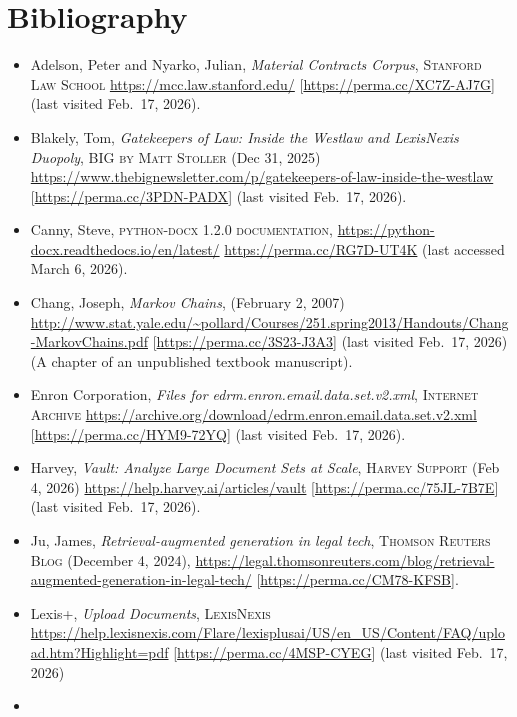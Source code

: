 \documentclass[
]{article}
\providecommand{\tightlist}{%
  \setlength{\itemsep}{0pt}\setlength{\parskip}{0pt}}
\begin{document}
\clearpage

\section{Bibliography}\label{bibliography}

\begin{itemize}
\tightlist
\item
  Adelson, Peter and Nyarko, Julian, \emph{Material Contracts Corpus}, \textsc{Stanford Law School} \url{https://mcc.law.stanford.edu/} {[}\url{https://perma.cc/XC7Z-AJ7G}{]} (last visited Feb.~17, 2026).
\item
  Blakely, Tom, \emph{Gatekeepers of Law: Inside the Westlaw and LexisNexis Duopoly}, \textsc{BIG by Matt Stoller} (Dec 31, 2025) \url{https://www.thebignewsletter.com/p/gatekeepers-of-law-inside-the-westlaw} {[}\url{https://perma.cc/3PDN-PADX}{]} (last visited Feb.~17, 2026).
\item
  Canny, Steve, \textsc{python-docx 1.2.0 documentation}, \url{https://python-docx.readthedocs.io/en/latest/} \url{https://perma.cc/RG7D-UT4K} (last accessed March 6, 2026).
\item
  Chang, Joseph, \emph{Markov Chains}, (February 2, 2007) \url{http://www.stat.yale.edu/~pollard/Courses/251.spring2013/Handouts/Chang-MarkovChains.pdf} {[}\url{https://perma.cc/3S23-J3A3}{]} (last visited Feb.~17, 2026) (A chapter of an unpublished textbook manuscript).
\item
  Enron Corporation, \emph{Files for edrm.enron.email.data.set.v2.xml}, \textsc{Internet Archive} \url{https://archive.org/download/edrm.enron.email.data.set.v2.xml} {[}\url{https://perma.cc/HYM9-72YQ}{]} (last visited Feb.~17, 2026).
\item
  Harvey, \emph{Vault: Analyze Large Document Sets at Scale}, \textsc{Harvey Support} (Feb 4, 2026) \url{https://help.harvey.ai/articles/vault} {[}\url{https://perma.cc/75JL-7B7E}{]} (last visited Feb.~17, 2026).
\item
  Ju, James, \emph{Retrieval-augmented generation in legal tech}, \textsc{Thomson Reuters Blog} (December 4, 2024), \url{https://legal.thomsonreuters.com/blog/retrieval-augmented-generation-in-legal-tech/} {[}\url{https://perma.cc/CM78-KFSB}{]}.
\item
  Lexis+, \emph{Upload Documents}, \textsc{LexisNexis} \url{https://help.lexisnexis.com/Flare/lexisplusai/US/en_US/Content/FAQ/upload.htm?Highlight=pdf} {[}\url{https://perma.cc/4MSP-CYEG}{]} (last visited Feb.~17, 2026)
\item

\end{itemize}
\end{document}
